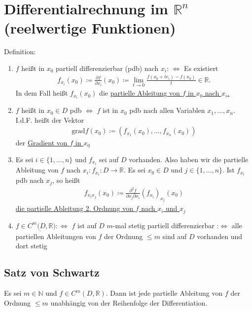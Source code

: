 \section{Differentialrechnung im $\mathbb{R}^n$ (reelwertige Funktionen)}
Definition:
\begin{enumerate}
    \item $f$ heißt in $x_0$ partiell differenzierbar (pdb) nach $x_i$: $\Leftrightarrow$
    Es existiert 
    \begin{align*}
        f_{x_i}(x_0) \coloneqq \frac{\partial f}{\partial x_i}(x_0) \coloneqq \lim \limits_{t \to 0} \frac{f(x_0 + te_i) - f(x_0)}{t} \in \mathbb{R}.
    \end{align*}
    In dem Fall heißt $f_{x_i}(x_0)$ die \underline{partielle Ableitung von $f$ in $x_0$ nach $x_i$.}
    \item $f$ heißt in $x_0 \in D$ pdb $\Leftrightarrow$ $f$ ist in $x_0$ pdb nach allen Variablen $x_1,\ldots,x_n$.
    I.d.F. heißt der Vektor
    \begin{align*}
        \text{grad} f(x_0) \coloneqq (f_{x_1}(x_0),\ldots,f_{x_n}(x_0))
    \end{align*}
    der \underline{Gradient von $f$ in $x_0$}
    \item Es sei $i \in \{1,\ldots,n\}$ und $f_{x_i}$ sei auf $D$ vorhanden. Also haben wir die partielle Ableitung von $f$ nach $x_i: f_{x_i}: D \to \mathbb{R}$.
    Es sei $x_0 \in D$ und $j \in \{1, \ldots,n \}$. Ist $f_{x_i}$ pdb nach $x_j$, so heißt
    \begin{align*}
        f_{x_ix_j}(x_0) \coloneqq \frac{\partial^2 f}{\partial x_j \partial x_i} (f_{x_i})_{x_j}(x_0)
    \end{align*}
    \underline{die partielle Ableitung 2. Ordnung von $f$ nach $x_i$ und $x_j$}
    \item $f \in \underline{C^m(D, \mathbb{R}}) :\Leftrightarrow$ $f$ ist auf $D$ $m$-mal stetig partiell differenzierbar 
    :$\Leftrightarrow$ alle partiellen Ableitungen von $f$ der Ordnung $\leq m$ sind auf $D$ vorhanden und dort stetig
\end{enumerate}

\subsection{Satz von Schwartz}
\label{sec: Schwartz}
Es sei $m \in \mathbb{N}$ und $f \in C^m(D,\mathbb{R})$. Dann ist jede partielle Ableitung von $f$ der Ordnung $\leq m$
unabhängig von der Reihenfolge der Differentiation.

